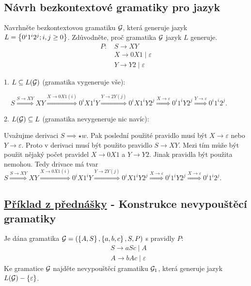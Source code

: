\subsection{Návrh bezkontextové gramatiky pro jazyk}
Navrhněte bezkontextovou gramatiku $\mathcal{G}$, která generuje jazyk $L = \left\lbrace 0^i 1^i 2^j; i, j \geq 0 \right\rbrace$. Zdůvodněte,
proč gramatika $\mathcal{G}$ jazyk $L$ generuje.
    \begin{align*}
        P\text{: } & S \rightarrow XY  \\
        & X \rightarrow 0X1 \mid \varepsilon  \\
        & Y \rightarrow Y2 \mid \varepsilon
    \end{align*}

1. $L \subseteq L(\mathcal{G})$ (gramatika vygeneruje vše):

$\quad S \stackrel{S \rightarrow XY}{\Longrightarrow} XY \stackrel{X \rightarrow 0X1 (i)}{\Longrightarrow} 0^iX1^iY
\stackrel{Y \rightarrow 2Y(j)}{\Longrightarrow} 0^iX1^iY2^j \stackrel{X \rightarrow \varepsilon}{\Longrightarrow}
0^i1^iY2^j\stackrel{Y \rightarrow \varepsilon}{\Longrightarrow} 0^i1^i2^j $.

2. $L(\mathcal{G}) \subseteq L$ (gramatika nevygeneruje nic navíc):

Uvažujme derivaci $S \implies\star w$. Pak poslední použité pravidlo musí být $X \rightarrow \varepsilon$ nebo
$Y \rightarrow \varepsilon$. Proto v derivaci musí být použito pravidlo $S \rightarrow XY$. Mezi tím může být použit
nějaký počet pravidel $X \rightarrow 0X1$ a $Y \rightarrow Y2$. Jinak pravidla být použita nemohou. Tedy drivace má tvar
$ S \stackrel{S \rightarrow XY}{\Longrightarrow} XY \stackrel{X \rightarrow 0X1 (i)}{\Longrightarrow} 0^iX1^iY
\stackrel{Y \rightarrow 2Y(j)}{\Longrightarrow} 0^iX1^iY2^j \stackrel{X \rightarrow \varepsilon}{\Longrightarrow}
0^i1^iY2^j\stackrel{X \rightarrow \varepsilon}{\Longrightarrow} 0^i1^i2^j $.

\subsection{\href{https://youtu.be/CWVxhYEyG4I?list=PLQL6z4JeTTQkLuzI78OTnfYBclE1g0UjS&t=811}{Příklad z přednášky} - Konstrukce nevypouštěcí gramatiky}
Je dána gramatika $\mathcal{G} = (\left\lbrace A,S \right\rbrace, \left\lbrace a,b,c \right\rbrace, S, P)$ s pravidly $P$:
\begin{align*}
    & S \rightarrow aSc \mid A \\
    & A \rightarrow bAc \mid \varepsilon
\end{align*}
Ke gramatice $\mathcal{G}$ najděte nevypouštěcí gramatiku $\mathcal{G}_1$, která generuje jazyk $L(\mathcal{G}) - \left\lbrace \varepsilon \right\rbrace$.

